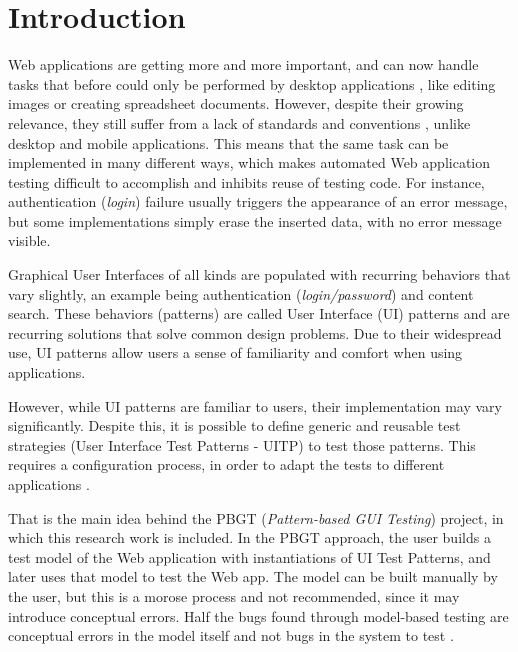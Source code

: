 \documentclass[conference]{IEEEtran}
\begin{document}
\IEEEpeerreviewmaketitle

\section{Introduction}\label{sec:intro}

Web applications are getting more and more important, and can now handle tasks that before could only be performed by desktop applications \cite{garrett2005ajax}, like editing images or creating spreadsheet documents. However, despite their growing relevance, they still suffer from a lack of standards and conventions \cite{constantine2002usage}, unlike desktop and mobile applications. This means that the same task can be implemented in many different ways, which makes automated Web application testing difficult to accomplish and inhibits reuse of testing code. For instance, authentication (\textit{login}) failure usually triggers the appearance of an error message, but some implementations simply erase the inserted data, with no error message visible.


Graphical User Interfaces of all kinds are populated with recurring behaviors that vary slightly, an example being authentication (\textit{login/password}) and content search. These behaviors (patterns) are called User Interface (UI) patterns \cite{van2001patterns} and are recurring solutions that solve common design problems. Due to their widespread use, UI patterns allow users a sense of familiarity and comfort when using applications. 

However, while UI patterns are familiar to users, their implementation may vary significantly.  Despite this, it is possible to define generic and reusable test strategies (User Interface Test Patterns - UITP) to test those patterns. This requires a configuration process, in order to adapt the tests to different applications \cite{morgado2012gui}. 

That is the main idea behind the PBGT (\textit{Pattern-based GUI Testing}) project, in which this research work is included. In the PBGT approach, the user builds a test model of the Web application with instantiations of UI Test Patterns, and later uses that model to test the Web app. The model can be built manually by the user, but this is a morose process and not recommended, since it may introduce conceptual errors. Half the bugs found through model-based testing are conceptual errors in the model itself and not bugs in the system to test \cite{dalal1999model}.
\end{document}
